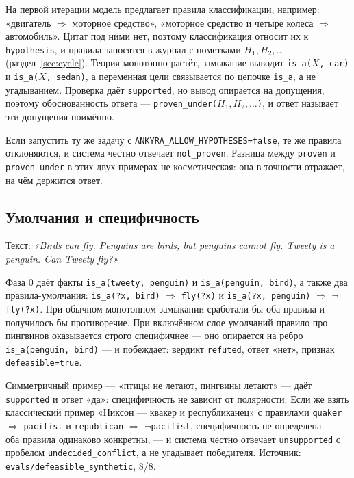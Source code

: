 \documentclass[11pt,a4paper]{article}
\begin{document}
На первой итерации модель предлагает правила классификации, например: «двигатель $\Rightarrow$ моторное средство»,
«моторное средство и четыре колеса $\Rightarrow$ автомобиль». Цитат под ними нет, поэтому классификация относит
их к \texttt{hypothesis}, и правила заносятся в журнал с пометками $H_1, H_2, \dots$ (раздел~\ref{sec:cycle}).
Теория монотонно растёт, замыкание выводит \texttt{is\_a($X$, car)} и \texttt{is\_a($X$, sedan)}, а переменная
цели связывается по цепочке \texttt{is\_a}, а не угадыванием. Проверка даёт \texttt{supported}, но вывод
опирается на допущения, поэтому обоснованность ответа — \texttt{proven\_under($H_1,H_2,\dots$)}, и ответ
называет эти допущения поимённо.

Если запустить ту же задачу с \texttt{ANKYRA\_ALLOW\_HYPOTHESES=false}, те же правила отклоняются, и система
честно отвечает \texttt{not\_proven}. Разница между \texttt{proven} и \texttt{proven\_under} в этих двух
примерах не косметическая: она в точности отражает, на чём держится ответ.

\subsection{Умолчания и специфичность}

Текст: \emph{«Birds can fly. Penguins are birds, but penguins cannot fly. Tweety is a penguin. Can Tweety fly?»}

Фаза 0 даёт факты \texttt{is\_a(tweety, penguin)} и \texttt{is\_a(penguin, bird)}, а также два правила-умолчания:
\texttt{is\_a(?x, bird)} $\Rightarrow$ \texttt{fly(?x)} и \texttt{is\_a(?x, penguin)} $\Rightarrow$ \texttt{$\neg$fly(?x)}.
При обычном монотонном замыкании сработали бы оба правила и получилось бы противоречие. При включённом слое умолчаний
правило про пингвинов оказывается строго специфичнее — оно опирается на ребро \texttt{is\_a(penguin, bird)}
 — и побеждает: вердикт \texttt{refuted}, ответ «нет», признак \texttt{defeasible=true}.

Симметричный пример — «птицы не летают, пингвины летают» — даёт \texttt{supported} и ответ «да»: специфичность не
зависит от полярности. Если же взять классический пример «Никсон — квакер и республиканец» с правилами \texttt{quaker}
$\Rightarrow$ \texttt{pacifist} и \texttt{republican} $\Rightarrow$ \texttt{$\neg$pacifist}, специфичность не
определена — оба правила одинаково конкретны, — и система честно отвечает \texttt{unsupported} с пробелом
\texttt{undecided\_conflict}, а не угадывает победителя. Источник: \texttt{evals/defeasible\_synthetic}, 8/8.
\end{document}
